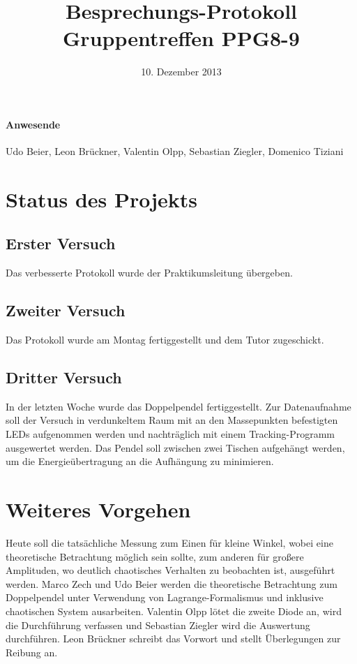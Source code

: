 \documentclass[
]{scrartcl}
\begin{document}
\title{Besprechungs-Protokoll Gruppentreffen PPG8-9}
\date{10. Dezember 2013}
\maketitle

\paragraph*{Anwesende}
Udo Beier,
Leon Brückner,
Valentin Olpp,
Sebastian Ziegler,
Domenico Tiziani


\section{Status des Projekts}

\subsection{Erster Versuch}
Das verbesserte Protokoll wurde der Praktikumsleitung übergeben. 

\subsection{Zweiter Versuch}
Das Protokoll wurde am Montag fertiggestellt und dem Tutor zugeschickt. 

\subsection{Dritter Versuch}
In der letzten Woche wurde das Doppelpendel fertiggestellt. Zur Datenaufnahme soll der Versuch in verdunkeltem Raum mit an den Massepunkten befestigten LEDs aufgenommen werden und nachträglich mit einem Tracking-Programm ausgewertet werden. Das Pendel soll zwischen zwei Tischen aufgehängt werden, um die Energieübertragung an die Aufhängung zu minimieren. 

\section{Weiteres Vorgehen}
Heute soll die tatsächliche Messung zum Einen für kleine Winkel, wobei eine theoretische Betrachtung möglich sein sollte, zum anderen für großere Amplituden, wo deutlich chaotisches Verhalten zu beobachten ist, ausgeführt werden. Marco Zech und Udo Beier werden die theoretische Betrachtung zum Doppelpendel unter Verwendung von Lagrange-Formalismus und inklusive chaotischen System ausarbeiten. Valentin Olpp lötet die zweite Diode an, wird die Durchführung verfassen und Sebastian Ziegler wird die Auswertung durchführen. Leon Brückner schreibt das Vorwort und stellt Überlegungen zur Reibung an. 
\end{document}
